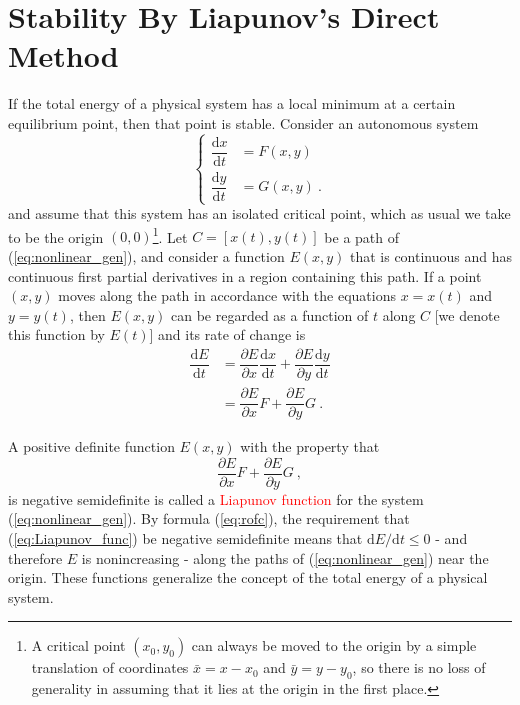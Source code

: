 \documentclass[12pt,a4paper]{article}
\newcommand{\dif}{\mathrm{d}}
\begin{document}
\section{Stability By Liapunov's Direct Method}
\cite{george1991differential, simmons2016differential} If the total energy of a physical system has a local minimum at a certain equilibrium point, then that point is stable. Consider an autonomous system
\begin{equation}
\left\{
\begin{aligned}
\dfrac{\dif x}{\dif t} & =  F(x,y) \\
\dfrac{\dif y}{\dif t} & =  G(x, y) ~.
\end{aligned}
\right.
\label{eq:nonlinear_gen}
\end{equation}
and assume that this system has an isolated critical point, which as usual we take to be the origin $(0,0)$\footnote{A critical point $(x_0,y_0)$ can always be moved to the origin by a simple translation of coordinates $\bar{x} = x - x_0$ and $\bar{y} = y - y_0$, so there is no loss of generality in assuming that it lies at the origin in the first place.}. Let $C = [x(t),y(t)]$ be a path of (\ref{eq:nonlinear_gen}), and consider a function $E(x,y)$ that is continuous and has continuous first partial derivatives in a region containing this path. If a point $(x,y)$ moves along the path in accordance with the equations $x = x(t)$ and $y = y(t)$, then $E(x,y)$ can be regarded as a function of $t$ along $C$ [we denote this function by $E(t)$] and its rate of change is
\begin{align}
\nonumber \dfrac{\dif E}{\dif t} &= \dfrac{\partial E}{\partial x} \dfrac{\dif x}{\dif t} + \dfrac{\partial E}{\partial y} \dfrac{\dif y}{\dif t} \\
&= \dfrac{\partial E}{\partial x} F + \dfrac{\partial E}{\partial y} G ~.
\label{eq:rofc}
\end{align}



A positive definite function $E(x,y)$ with the property that
\begin{equation}
\dfrac{\partial E}{\partial x} F + \dfrac{\partial E}{\partial y} G ~,
\label{eq:Liapunov_func}
\end{equation}
is negative semidefinite is called a \textcolor{red}{Liapunov function} for the system (\ref{eq:nonlinear_gen}). By formula (\ref{eq:rofc}), the requirement that (\ref{eq:Liapunov_func}) be negative semidefinite means that $\dif E/\dif t \leqslant 0$ - and therefore $E$ is nonincreasing - along the paths of (\ref{eq:nonlinear_gen}) near the origin. These functions generalize the concept of the total energy of a physical system.
\end{document}
